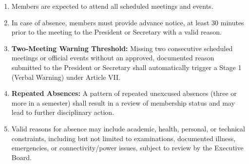 
\begin{enumerate}[label=\alph*), leftmargin=2em, itemsep=0.3em]
    \item Members are expected to attend all scheduled meetings and events.
    \item In case of absence, members must provide advance notice, at least 30 minutes prior to the meeting to the President or Secretary with a valid reason.
    \item \textbf{Two-Meeting Warning Threshold:} Missing two consecutive scheduled meetings or official events without an approved, documented reason submitted to the President or Secretary shall automatically trigger a Stage 1 (Verbal Warning) under Article VII.
    \item \textbf{Repeated Absences:} A pattern of repeated unexcused absences (three or more in a semester) shall result in a review of membership status and may lead to further disciplinary action.
    \item Valid reasons for absence may include academic, health, personal, or technical constraints, including but not limited to examinations, documented illness, emergencies, or connectivity/power issues, subject to review by the Executive Board.
\end{enumerate}
